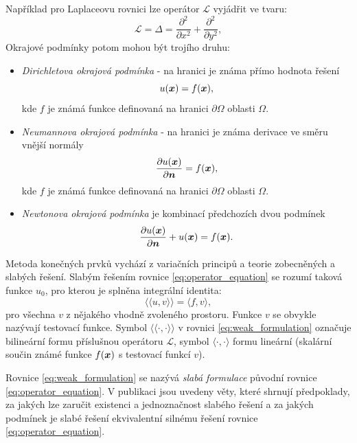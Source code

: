 \documentclass[12pt,a4paper,oneside]{article}
\numberwithin{equation}{section} %
\numberwithin{figure}{section} %
\numberwithin{table}{section} %
\renewcommand{\vec}[1]{\mbox{\boldmath$#1$}} %
\begin{document}
Například pro Laplaceovu rovnici lze operátor $\mathcal{L}$ vyjádřit ve tvaru:
\begin{equation}
\mathcal{L} = \Delta = \frac{\partial^2}{\partial x^2} +   \frac{\partial^2}{\partial y^2},
\label{eq:laplace_equation}
\end{equation}
Okrajové podmínky potom mohou být trojího druhu:
\begin{itemize}
\item \emph{Dirichletova okrajová podmínka} - na hranici je známa přímo hodnota řešení 
\begin{equation}
u(\vec{x}) = f(\vec{x}), 
\end{equation}
kde $f$ je známá funkce definovaná na hranici $\partial \Omega$ oblasti $\Omega$.
\item \emph{Neumannova okrajová podmínka} - na hranici je známa derivace ve směru vnější normály    
\begin{equation}
\frac{\partial u(\vec{x})}{\partial \vec{n}} = f(\vec{x}), 
\end{equation}
kde $f$ je známá funkce definovaná na hranici $\partial \Omega$ oblasti $\Omega$.
\item \emph{Newtonova okrajová podmínka} je kombinací předchozích dvou podmínek
\begin{equation}
\frac{\partial u(\vec{x})}{\partial \vec{n}} + u(\vec{x}) = f(\vec{x}). 
\end{equation}
\end{itemize}   
Metoda konečných prvků vychází z variačních principů a teorie zobecněných a slabých řešení.
Slabým řešením rovnice \ref{eq:operator_equation} se rozumí taková funkce $u_0$, pro kterou je splněna integrální identita:
\begin{equation}
\langle\langle u, v \rangle\rangle = \langle f, v \rangle,	
\label{eq:weak_formulation}
\end{equation}
pro všechna $v$ z nějakého vhodně zvoleného prostoru. Funkce $v$ se obvykle nazývají testovací funkce. Symbol $\langle\langle \cdot, \cdot \rangle\rangle$ v rovnici \ref{eq:weak_formulation} označuje bilineární formu příslušnou operátoru $\mathcal{L}$, symbol $\langle \cdot, \cdot \rangle$ formu lineární (skalární součin známé funkce $f(\vec{x})$ s testovací funkcí $v$).
 
Rovnice \ref{eq:weak_formulation} se nazývá \emph{slabá formulace} původní rovnice \ref{eq:operator_equation}. V publikaci \cite{Rektorys} jsou uvedeny věty, které shrnují předpoklady, za jakých lze zaručit existenci a jednoznačnost slabého řešení a za jakých podmínek je slabé řešení ekvivalentní silnému řešení rovnice \ref{eq:operator_equation}.
\end{document}

